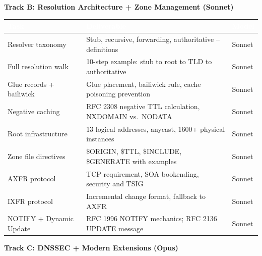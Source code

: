 \documentclass[11pt,letterpaper]{article}
\newcommand{\tableheader}[1]{\textbf{\sffamily\textcolor{white}{#1}}}
\begin{document}
\textbf{Track B: Resolution Architecture + Zone Management (Sonnet)}

\begin{center}
\begin{tabularx}{\textwidth}{L{4cm}XC{1.8cm}}
\toprule
{}
\tableheader{Task} & \tableheader{Deliverable} & \tableheader{Model} \\
\midrule
Resolver taxonomy & Stub, recursive, forwarding, authoritative -- definitions & Sonnet \\
Full resolution walk & 10-step example: stub to root to TLD to authoritative & Sonnet \\
Glue records + bailiwick & Glue placement, bailiwick rule, cache poisoning prevention & Sonnet \\
Negative caching & RFC 2308 negative TTL calculation, NXDOMAIN vs.\ NODATA & Sonnet \\
Root infrastructure & 13 logical addresses, anycast, 1600+ physical instances & Sonnet \\
Zone file directives & \$ORIGIN, \$TTL, \$INCLUDE, \$GENERATE with examples & Sonnet \\
AXFR protocol & TCP requirement, SOA bookending, security and TSIG & Sonnet \\
IXFR protocol & Incremental change format, fallback to AXFR & Sonnet \\
NOTIFY + Dynamic Update & RFC 1996 NOTIFY mechanics; RFC 2136 UPDATE message & Sonnet \\
\bottomrule
\end{tabularx}
\end{center}

\textbf{Track C: DNSSEC + Modern Extensions (Opus)}
\end{document}
